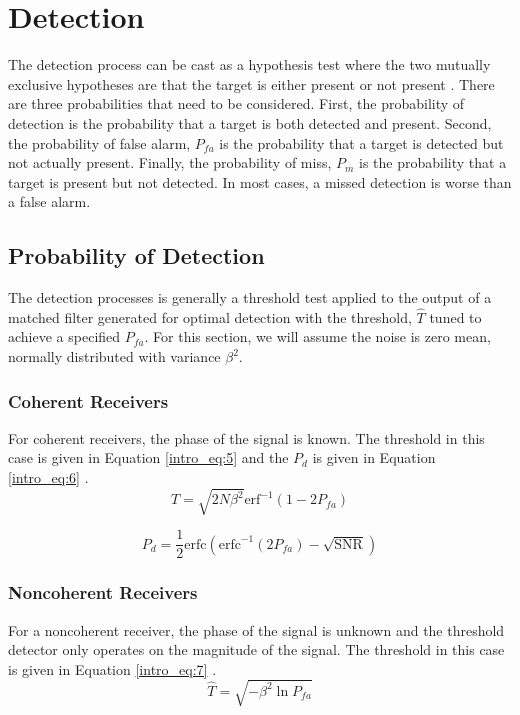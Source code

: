 \section{Detection}
The detection process can be cast as a hypothesis test where the two mutually exclusive hypotheses are that the target is either present or not present \cite{richards_radar}. There are three probabilities that need to be considered. First, the probability of detection is the probability that a target is both detected and present. Second, the probability of false alarm, $P_{fa}$ is the probability that a target is detected but not actually present. Finally, the probability of miss, $P_m$ is the probability that a target is present but not detected. In most cases, a missed detection is worse than a false alarm.

\subsection{Probability of Detection}
The detection processes is generally a threshold test applied to the output of a matched filter generated for optimal detection with the threshold, $\hat{T}$ tuned to achieve a specified $P_{fa}$. For this section, we will assume the noise is zero mean, normally distributed  with variance $\beta^2$. 

\subsubsection{Coherent Receivers}
For coherent receivers, the phase of the signal is known. The threshold in this case is given in Equation \ref{intro_eq:5} and the $P_d$ is given in Equation \ref{intro_eq:6} \cite{richards_radar}.
\begin{equation} 
    \label{intro_eq:5}
\hat{T} = \sqrt{2N\beta^2}\text{erf}^{-1}(1-2P_{fa})
\end{equation}

\begin{equation}
    \label{intro_eq:6}
P_d = \frac{1}{2} \text{erfc}\left(\text{erfc}^{-1}(2P_{fa}) - \sqrt{\text{SNR}} \right)
\end{equation}

\subsubsection{Noncoherent Receivers}
For a noncoherent receiver, the phase of the signal is unknown and the threshold detector only operates on the magnitude of the signal. The threshold in this case is given in Equation \ref{intro_eq:7} \cite{richards_radar}.
\begin{equation}
    \label{intro_eq:7}
\hat{T} = \sqrt{-\beta^2 \ln{P_{fa}}}
\end{equation}


